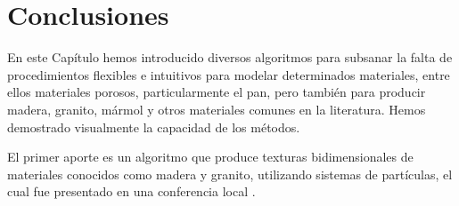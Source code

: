 \documentclass[spanish,a4paper,openright,11pt]{book}
\begin{document}








\section{Conclusiones}
En este Cap\'itulo hemos introducido diversos algoritmos para subsanar la falta de procedimientos flexibles e intuitivos para modelar determinados materiales, entre ellos materiales porosos, particularmente el pan, pero también para producir madera, granito, mármol y otros materiales comunes en la literatura.
Hemos demostrado visualmente la capacidad de los métodos.

El primer aporte es un algoritmo que produce texturas bidimensionales de materiales conocidos como madera y granito, utilizando sistemas de partículas, el cual fue presentado en una conferencia local \cite{Baravalle2011}.
\end{document}
